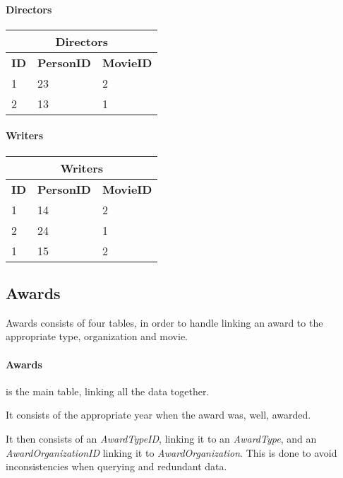 \paragraph{Directors}

\begin{center}
\begin{tabular}{|l|l|l|}
\hline
\multicolumn{3}{|c|}{Directors} \\ \hline \hline
\textbf{ID} & \textbf{PersonID} & \textbf{MovieID} \\ \hline \hline
1 & 23 & 2 \\ \hline
2 & 13 & 1 \\ \hline
\end{tabular}
\end{center}

\paragraph{Writers}

\begin{center}
\begin{tabular}{|l|l|l|}
\hline
\multicolumn{3}{|c|}{Writers} \\ \hline \hline
\textbf{ID} & \textbf{PersonID} & \textbf{MovieID} \\ \hline \hline
1 & 14 & 2 \\ \hline
2 & 24 & 1 \\ \hline
1 & 15 & 2 \\ \hline
\end{tabular}
\end{center}

\subsection{Awards}

Awards consists of four tables, in order to handle linking an award to the appropriate type, organization and movie.

\paragraph{Awards} is the main table, linking all the data together.

It consists of the appropriate year when the award was, well, awarded.

It then consists of an \textit{AwardTypeID}, linking it to an \textit{AwardType}, and an \textit{AwardOrganizationID} linking it to \textit{AwardOrganization}.
This is done to avoid inconsistencies when querying and redundant data.


